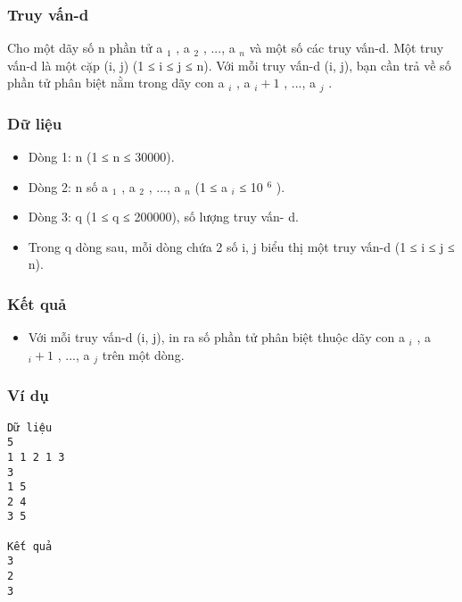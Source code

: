 



\subsubsection{   Truy vấn-d  }

   Cho một dãy số n phần tử a   $_    1   $   ,   a   $_    2   $   , ..., a   $_    n   $   và một số các truy vấn-d. Một truy vấn-d là một cặp (i, j) (1 ≤ i   ≤ j ≤ n). Với mỗi truy vấn-d (i, j), bạn cần trả về số phần   tử phân biệt nằm trong dãy con a   $_    i   $   ,   a   $_    i+1   $   , ..., a   $_    j   $   .  

\subsubsection{   Dữ liệu  }
\begin{itemize}
	\item     Dòng 1: n (1 ≤ n ≤ 30000).   
	\item     Dòng 2: n số a    $_     1    $    , a    $_     2    $    , ...,   a    $_     n    $    (1 ≤ a    $_     i    $    ≤   10    $^     6    $    ).   
	\item     Dòng 3: q (1 ≤ q ≤ 200000), số lượng truy vấn-  d.   
	\item     Trong q dòng sau, mỗi dòng chứa 2 số i, j biểu thị một   truy vấn-d (1 ≤ i ≤ j ≤ n).   
\end{itemize}

\subsubsection{   Kết quả  }
\begin{itemize}
	\item     Với mỗi truy vấn-d (i, j), in ra số phần tử phân biệt thuộc   dãy con a    $_     i    $    , a    $_     i+1    $    , ...,   a    $_     j    $    trên một dòng.    


\end{itemize}

\subsubsection{   Ví dụ  }
\begin{verbatim}
Dữ liệu
5
1 1 2 1 3
3
1 5
2 4
3 5

Kết quả
3
2
3 
\end{verbatim}